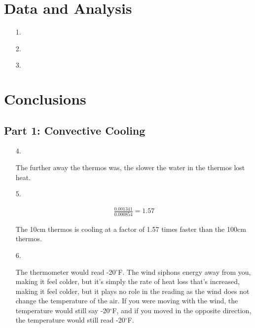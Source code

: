 ﻿\documentclass[12pt, letterpaper]{article}
\begin{document}
    \section*{Data and Analysis}
    \begin{enumerate}
        \item [1.]
        \begin{mdframed}
            
        \end{mdframed}
        \item [2.]
        \item [3.]
    \end{enumerate}

    \section*{Conclusions}

    \subsection*{Part 1: Convective Cooling}

    \begin{enumerate}
        \item [4.]\mbox{}
        \begin{mdframed}
            The further away the thermos was, the slower the water in the thermos lost heat.
        \end{mdframed}

        \item [5.]\mbox{}
        \begin{mdframed}
            \begin{equation}
                \begin{gathered}
                \frac{0.001341}{0.000854} = 1.57
                \end{gathered}
            \end{equation}

            The 10cm thermos is cooling at a factor of 1.57 times faster than the 100cm thermos.
        \end{mdframed}

        \item [6.]\mbox{}
        \begin{mdframed}
            The thermometer would read -20$^{\circ}$F. The wind siphons energy away from you, making it feel colder, but it's simply the rate of heat loss that's increased, making it feel colder, but it plays no role in the reading as the wind does not change the temperature of the air. If you were moving with the wind, the temperature would still say -20$^{\circ}$F, and if you moved in the opposite direction, the temperature would still read -20$^{\circ}$F.
        \end{mdframed}
    \end{enumerate}
\end{document}
